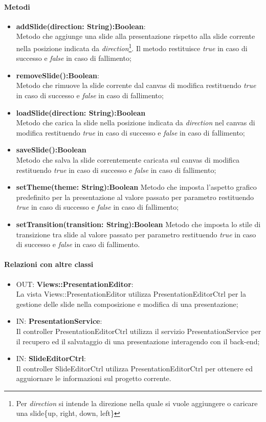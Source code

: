 	\paragraph{Metodi}
	\begin{itemize}
		\item \textbf{addSlide(direction: String):Boolean}:\\
			Metodo che aggiunge una slide alla presentazione rispetto alla slide corrente nella posizione indicata da \textit{direction}\footnote{Per \textit{direction} si intende la direzione nella quale si vuole aggiungere o caricare una slide\{up, right, down, left\}}. Il metodo restituisce \textit{true} in caso di successo e \textit{false} in caso di fallimento;
		\item \textbf{removeSlide():Boolean}:\\
			Metodo che rimuove la slide corrente dal canvas di modifica restituendo \textit{true} in caso di successo e \textit{false} in caso di fallimento;
		\item \textbf{loadSlide(direction: String):Boolean}\\
			Metodo che carica la slide nella posizione indicata da \textit{direction} nel canvas di modifica restituendo \textit{true} in caso di successo e \textit{false} in caso di fallimento;
		\item \textbf{saveSlide():Boolean}\\
			Metodo che salva la slide correntemente caricata sul canvas di modifica restituendo \textit{true} in caso di successo e \textit{false} in caso di fallimento;
		\item \textbf{setTheme(theme: String):Boolean}
			Metodo che imposta l'aspetto grafico predefinito per la presentazione al valore passato per parametro restituendo \textit{true} in caso di successo e \textit{false} in caso di fallimento;
		\item \textbf{setTransition(transition: String):Boolean}
			Metodo che imposta lo stile di transizione tra slide al valore passato per parametro restituendo \textit{true} in caso di successo e \textit{false} in caso di fallimento.
	\end{itemize}
	\paragraph{Relazioni con altre classi}
	\begin{itemize}
	  \item OUT: \textbf{Views::PresentationEditor}:\\
		La vista Views::PresentationEditor utilizza PresentationEditorCtrl per la gestione delle slide nella composizione e modifica di una presentazione;
	  \item IN: \textbf{PresentationService}:\\
	  	Il controller PresentationEditorCtrl utilizza il servizio PresentationService per il recupero ed il salvataggio di una presentazione interagendo con il back-end;
	  \item IN: \textbf{SlideEditorCtrl}:\\
	  	Il controller SlideEditorCtrl utilizza PresentationEditorCtrl per ottenere ed agguiornare le informazioni sul progetto corrente.
	\end{itemize}

